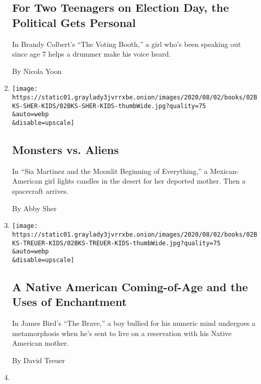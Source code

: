 \begin{enumerate}
  \hypertarget{for-two-teenagers-on-election-day-the-political-gets-personal}{%
  \subsection{For Two Teenagers on Election Day, the Political Gets
  Personal}\label{for-two-teenagers-on-election-day-the-political-gets-personal}}

  In Brandy Colbert's ``The Voting Booth,'' a girl who's been speaking
  out since age 7 helps a drummer make his voice heard.

  By Nicola Yoon
\item
  \href{/2020/07/31/books/review/sia-martinez-and-the-moonlit-beginning-of-everything-raquel-vasquez-gilliland.html}{}

  \texttt{[image: https://static01.graylady3jvrrxbe.onion/images/2020/08/02/books/02BKS-SHER-KIDS/02BKS-SHER-KIDS-thumbWide.jpg?quality=75\\\&auto=webp\\\&disable=upscale]}

  \hypertarget{monsters-vs-aliens}{%
  \subsection{Monsters vs. Aliens}\label{monsters-vs-aliens}}

  In ``Sia Martinez and the Moonlit Beginning of Everything,'' a
  Mexican-American girl lights candles in the desert for her deported
  mother. Then a spacecraft arrives.

  By Abby Sher
\item
  \href{/2020/07/31/books/review/the-brave-james-bird.html}{}

  \texttt{[image: https://static01.graylady3jvrrxbe.onion/images/2020/08/02/books/02BKS-TREUER-KIDS/02BKS-TREUER-KIDS-thumbWide.jpg?quality=75\\\&auto=webp\\\&disable=upscale]}

  \hypertarget{a-native-american-coming-of-age-and-the-uses-of-enchantment}{%
  \subsection{A Native American Coming-of-Age and the Uses of
  Enchantment}\label{a-native-american-coming-of-age-and-the-uses-of-enchantment}}

  In James Bird's ``The Brave,'' a boy bullied for his numeric mind
  undergoes a metamorphosis when he's sent to live on a reservation with
  his Native American mother.

  By David Treuer
\item
  \href{/2020/07/24/books/review/hilary-mckay-the-time-of-green-magic.html}{}


\end{enumerate}
